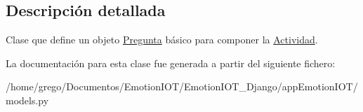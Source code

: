 \subsection{Descripción detallada}
Clase que define un objeto \hyperlink{classappEmotionIOT_1_1models_1_1Pregunta}{Pregunta} básico para componer la \hyperlink{classappEmotionIOT_1_1models_1_1Actividad}{Actividad}. 

La documentación para esta clase fue generada a partir del siguiente fichero\+:\begin{DoxyCompactItemize}
\item 
/home/grego/\+Documentos/\+Emotion\+I\+O\+T/\+Emotion\+I\+O\+T\+\_\+\+Django/app\+Emotion\+I\+O\+T/models.\+py\end{DoxyCompactItemize}

